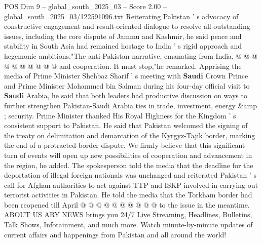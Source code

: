 \begin{textsample}{POS Dim 9 – global\_south\_2025\_03 – Score 2.00 – global\_south\_2025\_03/122591096.txt}
Reiterating Pakistan ' s advocacy of constructive engagement and result-oriented dialogue to resolve all outstanding issues, including the core dispute of Jammu and Kashmir, he said peace and stability in South Asia had remained hostage to India ' s rigid approach and hegemonic ambitions."The anti-Pakistan narrative, emanating from India, @ @ @ @ @ @ @ @ @ @ and cooperation.
It must stop,"he remarked.
Apprising the media of Prime Minister Shehbaz Sharif ' s meeting with \textbf{Saudi} Crown Prince and Prime Minister Mohammed bin Salman during his four-day official visit to \textbf{Saudi} Arabia, he said that both leaders had productive discussion on ways to further strengthen Pakistan-Saudi Arabia ties in trade, investment, energy \&amp ; security.
Prime Minister thanked His Royal Highness for the Kingdom ' s consistent support to Pakistan.
He said that Pakistan welcomed the signing of the treaty on delimitation and demarcation of the Kyrgyz-Tajik border, marking the end of a protracted border dispute.
We firmly believe that this significant turn of events will open up new possibilities of cooperation and advancement in the region, he added.
The spokesperson told the media that the deadline for the deportation of illegal foreign nationals was unchanged and reiterated Pakistan ' s call for Afghan authorities to act against TTP and ISKP involved in carrying out terrorist activities in Pakistan.
He told the media that the Torkham border had been reopened till April @ @ @ @ @ @ @ @ @ @ to the issue in the meantime.
ABOUT US ARY NEWS brings you 24/7 Live Streaming, Headlines, Bulletins, Talk Shows, Infotainment, and much more.
Watch minute-by-minute updates of current affairs and happenings from Pakistan and all around the world!

\end{textsample}
